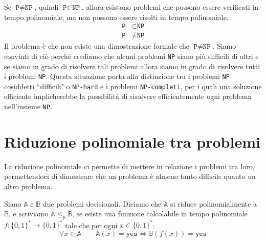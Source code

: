 \begin{tcolorbox}[title = {Congettura $\texttt{P} \neq \texttt{NP}$}]
    Se $\texttt{P} \neq \texttt{NP}$, quindi $\texttt{P} \subset \texttt{NP}$, allora
    esistono problemi che possono essere verificati in tempo polinomiale, ma non possono
    essere risolti in tempo polinomiale.
    \begin{align*}
        \texttt{P} &\subset \texttt{NP} \\
        \texttt{P} &\neq \texttt{NP}
    \end{align*}
    Il problema è che non esiste una dimostrazione formale che 
    $\texttt{P} \neq \texttt{NP}$. Siamo convinti di ciò perché crediamo che alcuni
    problemi \texttt{NP} siano
    più difficili di altri e se siamo in grado di risolvere tali problemi allora 
    siamo in grado di risolvere tutti i problemi \texttt{NP}. Questa situazione
    porta alla distinzione tra i problemi \texttt{NP} cosiddetti ``difficili" o
    \texttt{NP-hard} e i problemi \texttt{NP-completi}, per i quali una soluzione
    efficiente implicherebbe la possibilità di risolvere efficientemente ogni problema
    nell'insieme \texttt{NP}.

\end{tcolorbox}
\begin{figure}[H]
    \centering
\end{figure}
\section{Riduzione polinomiale tra problemi}
La riduzione polinomiale ci permette di mettere in relazione i problemi tra loro, 
permettendoci di dimostrare che un problema è almeno tanto difficile quanto un altro
problema.
\begin{tcolorbox}[title = {Riduzione polinomiale (Karp)}]
    Siano $\mathbb{A}$ e $\mathbb{B}$ due problemi decisionali. Diciamo che $\mathbb{A}$
    si riduce polinomialmente a $\mathbb{B}$, e scriviamo $\mathbb{A} \leq_p \mathbb{B}$,
    se esiste una funzione calcolabile in tempo polinomiale $f: \{0,1\}^* \rightarrow
    \{0,1\}^*$ tale che per ogni $x \in \{0,1\}^*$:
    \[
        \forall x \in \mathbb{A} \qquad \mathbb{A}(x) = \texttt{yes} \iff \mathbb{B}(f(x)) = \texttt{yes}
    \]
\end{tcolorbox}
